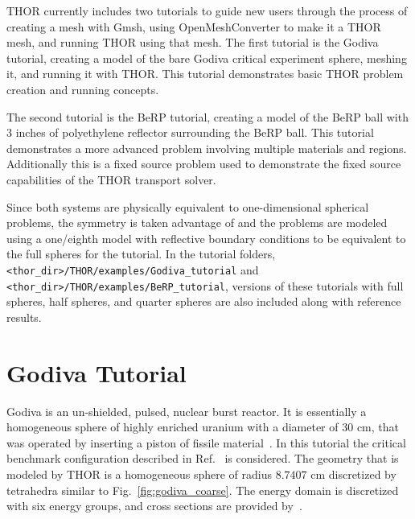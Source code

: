 \ac{THOR} currently includes two tutorials to guide new users through the process of creating a mesh with Gmsh, using OpenMeshConverter to make it a \ac{THOR} mesh, and running \ac{THOR} using that mesh.
The first tutorial is the Godiva tutorial, creating a model of the bare Godiva critical experiment sphere, meshing it, and running it with \ac{THOR}.
This tutorial demonstrates basic \ac{THOR} problem creation and running concepts.

The second tutorial is the BeRP tutorial, creating a model of the BeRP ball with 3 inches of polyethylene reflector surrounding the BeRP ball.
This tutorial demonstrates a more advanced problem involving multiple materials and regions.
Additionally this is a fixed source problem used to demonstrate the fixed source capabilities of the THOR transport solver.

Since both systems are physically equivalent to one-dimensional spherical problems, the symmetry is taken advantage of and the problems are modeled using a one/eighth model with reflective boundary conditions to be equivalent to the full spheres for the tutorial.
In the tutorial folders, \\
\verb"<thor_dir>/THOR/examples/Godiva_tutorial" and \verb"<thor_dir>/THOR/examples/BeRP_tutorial", versions of these tutorials with full spheres, half spheres, and quarter spheres are also included along with reference results.

\section{Godiva Tutorial}

Godiva is an un-shielded, pulsed, nuclear burst reactor. It is essentially a homogeneous sphere of highly enriched uranium with a diameter of $30$ cm, that was operated by inserting a piston of fissile material~\cite{Godiva1961}.
In this tutorial the critical benchmark configuration described in Ref.~\cite{GodivaBenchmark} is considered. The geometry that is modeled by \ac{THOR} is a homogeneous sphere of radius $8.7407$ cm discretized by tetrahedra similar to Fig.~\ref{fig:godiva_coarse}.
The energy domain is discretized with six energy groups, and cross sections are provided by~\cite{GodivaBenchmark}.

